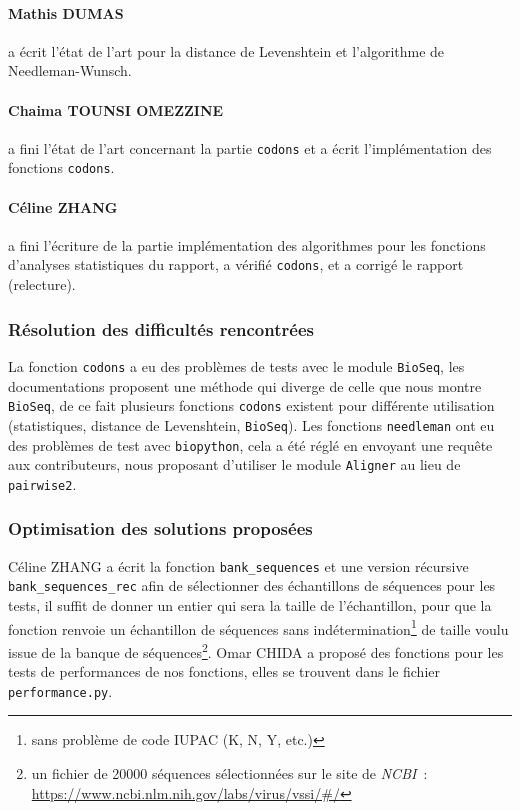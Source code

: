 \paragraph*{Mathis DUMAS} a écrit l'état de l'art pour la distance de Levenshtein et l'algorithme de Needleman-Wunsch.

\paragraph*{Chaima TOUNSI OMEZZINE} a fini l'état de l'art concernant la partie \texttt{codons} et a écrit l'implémentation des fonctions \texttt{codons}.

\paragraph*{Céline ZHANG} a fini l'écriture de la partie implémentation des algorithmes pour les fonctions d'analyses statistiques du rapport, a vérifié \texttt{codons}, et a corrigé le rapport (relecture).

\subsubsection*{Résolution des difficultés rencontrées}
La fonction \texttt{codons} a eu des problèmes de tests avec le module \texttt{BioSeq}, les documentations proposent une méthode qui diverge de celle que nous montre \texttt{BioSeq}, de ce fait plusieurs fonctions \texttt{codons} existent pour différente utilisation (statistiques, distance de Levenshtein, \texttt{BioSeq}). Les fonctions \texttt{needleman} ont eu des problèmes de test avec \texttt{biopython}, cela a été réglé en envoyant une requête aux contributeurs, nous proposant d'utiliser le module \texttt{Aligner} au lieu de \texttt{pairwise2}.

\subsubsection*{Optimisation des solutions proposées}
Céline ZHANG a écrit la fonction \texttt{bank\_sequences} et une version récursive \texttt{bank\_sequences\_rec} afin de sélectionner des échantillons de séquences pour les tests, il suffit de donner un entier qui sera la taille de l'échantillon, pour que la fonction renvoie un échantillon de séquences sans indétermination\footnote{sans problème de code IUPAC (K, N, Y, etc.)} de taille voulu issue de la banque de séquences\footnote{un fichier de 20000 séquences sélectionnées sur le site de \textsl{NCBI}~: \url{https://www.ncbi.nlm.nih.gov/labs/virus/vssi/\#/}}. Omar CHIDA a proposé des fonctions pour les tests de performances de nos fonctions, elles se trouvent dans le fichier \texttt{performance.py}.

